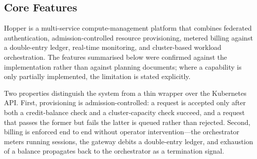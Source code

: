 \documentclass[12pt,a4paper]{article}
\begin{document}
\subsection{Core Features}
Hopper is a multi-service compute-management platform that combines federated
authentication, admission-controlled resource provisioning, metered billing
against a double-entry ledger, real-time monitoring, and cluster-based workload
orchestration. The features summarised below were confirmed against the
implementation rather than against planning documents; where a capability is
only partially implemented, the limitation is stated explicitly.

Two properties distinguish the system from a thin wrapper over the Kubernetes
API. First, provisioning is admission-controlled: a request is accepted only
after both a credit-balance check and a cluster-capacity check succeed, and a
request that passes the former but fails the latter is queued rather than
rejected. Second, billing is enforced end to end without operator
intervention---the orchestrator meters running sessions, the gateway debits a
double-entry ledger, and exhaustion of a balance propagates back to the
orchestrator as a termination signal.

\small
\renewcommand{\arraystretch}{1.25}
\end{document}
